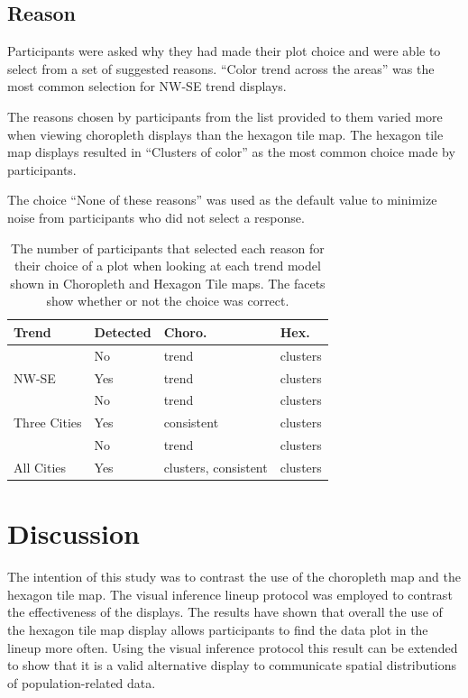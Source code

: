 \documentclass[journal]{vgtc}                     %
\begin{document}
\hypertarget{reason}{%
\subsection{Reason}\label{reason}}

Participants were asked why they had made their plot choice and were able to select from a set of suggested reasons.
``Color trend across the areas'' was the most common selection for NW-SE trend displays.

The reasons chosen by participants from the list provided to them varied more when viewing choropleth displays than the hexagon tile map.
The hexagon tile map displays resulted in ``Clusters of color'' as the most common choice made by participants.

The choice ``None of these reasons'' was used as the default value to minimize noise from participants who did not select a response.

\begin{table}

\caption{\label{tab:reason}The number of participants that selected each reason for their choice of a plot when looking at each trend model shown in Choropleth and Hexagon Tile maps. The facets show whether or not the choice was correct.}
\centering
\begin{tabular}[t]{llll}
\toprule
Trend & Detected & Choro. & Hex.\\
\midrule
 & No & trend & clusters\\
\cmidrule{2-4}
\multirow{-2}{*}{\raggedright NW-SE} & Yes & trend & clusters\\
\cmidrule{1-4}
 & No & trend & clusters\\
\cmidrule{2-4}
\multirow{-2}{*}{\raggedright Three Cities} & Yes & consistent & clusters\\
\cmidrule{1-4}
 & No & trend & clusters\\
\cmidrule{2-4}
\multirow{-2}{*}{\raggedright All Cities} & Yes & clusters, consistent & clusters\\
\bottomrule
\end{tabular}
\end{table}

\hypertarget{discussion}{%
\section{Discussion}\label{discussion}}

The intention of this study was to contrast the use of the choropleth map and the hexagon tile map.
The visual inference lineup protocol was employed to contrast the effectiveness of the displays.
The results have shown that overall the use of the hexagon tile map display allows participants to find the data plot in the lineup more often.
Using the visual inference protocol this result can be extended to show that it is a valid alternative display to communicate spatial distributions of population-related data.
\end{document}
